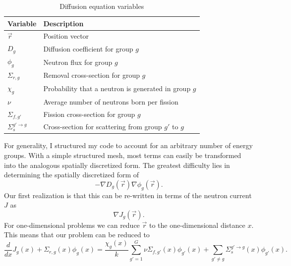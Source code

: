 \documentclass[12pt]{report}
\begin{document}
	\begin{table}[ht]
		\begin{center}
			\caption{\label{tab::diff_vars} Diffusion equation variables}
			\begin{tabular}{ll}
				\hline
				Variable & Description \\
				\hline
				$\vec{r}$ & Position vector \\
				$D_g$ & Diffusion coefficient for group $g$ \\
				$\phi_g$ & Neutron flux for group $g$ \\
				$\Sigma_{r,g}$ & Removal cross-section for group $g$ \\
				$\chi_g$ & Probability that a neutron is generated in group $g$ \\
				$\nu$ & Average number of neutrons born per fission \\
				$\Sigma_{f,g'}$ & Fission cross-section for group $g$ \\
				$\Sigma_{s}^{g' \rightarrow g}$ & Cross-section for scattering from group $g'$ to $g$ \\
				\hline
			\end{tabular}
		\end{center}
	\end{table}
	
	For generality, I structured my code to account for an arbitrary number of energy groups. With a simple structured mesh, most terms can easily be transformed into the analogous spatially discretized form. The greatest difficulty lies in determining the spatially discretized form of
	\begin{equation}
	- \nabla D_g(\vec{r}) \nabla \phi_g(\vec{r}).
	\end{equation}
	Our first realization is that this can be re-written in terms of the neutron current $J$ as
	\begin{equation}
	\nabla J_g(\vec{r}).
	\end{equation}
	For one-dimensional problems we can reduce $\vec{r}$ to the one-dimensional distance $x$. This means that our problem can be reduced to 
	\begin{equation}
	\frac{d}{dx} J_g(x) + \Sigma_{r,g}(x) \phi_g(x) = \frac{\chi_g(x)}{k} \sum_{g'=1}^{G} \nu \Sigma_{f,g'}(x) \phi_{g'}(x) + \sum_{g'\neq g} \Sigma_{s}^{g' \rightarrow g}(x) \phi_{g'}(x).
	\end{equation}
	
\end{document}
